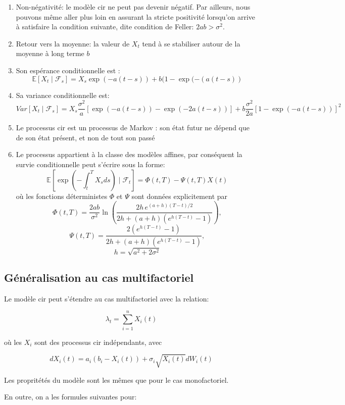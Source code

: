 \begin{enumerate}
    \item Non-négativité: le modèle \gls{cir} ne peut pas devenir négatif. Par ailleurs, nous pouvons même aller plus loin en assurant la stricte positivité lorsqu'on arrive à satisfaire la condition suivante, dite condition de Feller: $2ab > \sigma^2$.
    \item Retour vers la moyenne: la valeur de $X_t$ tend à se stabiliser autour de la moyenne à long terme $b$
    \item Son espérance conditionnelle est : $$\mathbb{E}[X_t \mid \mathcal{F}_s] = X_s \exp(-a(t-s)) + b(1 - \exp(-(a(t-s))$$
    \item Sa variance conditionnelle est: $$Var[X_t \mid \mathcal{F}_s] = X_s \frac{\sigma^2}{a}[\exp(-a(t-s)) - \exp(-2a(t-s))] + b \frac{\sigma^2}{2a}[1 - \exp(-a(t-s))]^2$$
    \item Le processus \gls{cir} est un processus de Markov : son état futur ne dépend que de son état présent, et non de tout son passé
    \item Le processus appartient à la classe des modèles affines, par conséquent la survie conditionnelle peut s'écrire sous la forme:
    $$\mathbb{E}[\exp(-\int_t^T X_s ds) \mid \mathcal{F}_t] = \Phi(t, T) - \Psi(t, T)X(t)$$
    où les fonctions déterministes $\Phi$ et $\Psi$ sont données explicitement par
    \[
    \Phi(t,T) = \frac{2ab}{\sigma^2}\ln\left(\frac{2h \, e^{(a+h)(T-t)/2}}{2h + (a+h)\left(e^{h(T-t)}-1\right)}\right),
    \]
    \[\Psi(t,T) = \frac{2\left(e^{h(T-t)}-1\right)}{2h + (a+h)\left(e^{h(T-t)}-1\right)},
    \]
    \[
    h = \sqrt{a^2 + 2 \sigma^2}
    \]
\end{enumerate}


\subsection{Généralisation au cas multifactoriel}

Le modèle \gls{cir} peut s'étendre au cas multifactoriel avec la relation:

$$\lambda_t = \sum_{i = 1}^n X_i(t)$$

où les $X_i$ sont des processus \gls{cir} indépendants, avec

$$dX_i(t) = a_i(b_i - X_i(t)) + \sigma_i \sqrt{X_i(t)}dW_i(t)$$

Les propritétés du modèle sont les mêmes que pour le cas monofactoriel.

En outre, on a les formules suivantes pour:

